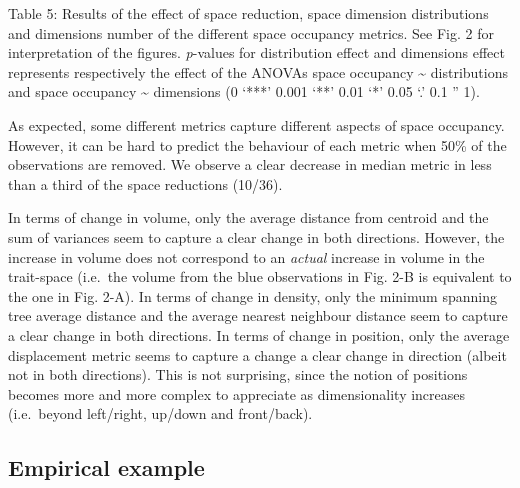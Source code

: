 \documentclass[]{article}
\begin{document}
Table 5: Results of the effect of space reduction, space dimension
distributions and dimensions number of the different space occupancy
metrics. See Fig. 2 for interpretation of the figures. \emph{p}-values
for distribution effect and dimensions effect represents respectively
the effect of the ANOVAs space occupancy \textasciitilde{} distributions
and space occupancy \textasciitilde{} dimensions (0 `***' 0.001 `**'
0.01 `*' 0.05 `.' 0.1 '' 1).

\renewcommand\baselinestretch{2}\selectfont


As expected, some different metrics capture different aspects of space
occupancy. However, it can be hard to predict the behaviour of each
metric when 50\% of the observations are removed. We observe a clear
decrease in median metric in less than a third of the space reductions
(10/36).

In terms of change in volume, only the average distance from centroid
and the sum of variances seem to capture a clear change in both
directions. However, the increase in volume does not correspond to an
\emph{actual} increase in volume in the trait-space (i.e.~the volume
from the blue observations in Fig. 2-B is equivalent to the one in Fig.
2-A). In terms of change in density, only the minimum spanning tree
average distance and the average nearest neighbour distance seem to
capture a clear change in both directions. In terms of change in
position, only the average displacement metric seems to capture a change
a clear change in direction (albeit not in both directions). This is not
surprising, since the notion of positions becomes more and more complex
to appreciate as dimensionality increases (i.e.~beyond left/right,
up/down and front/back).

\subsection{Empirical example}\label{empirical-example}

\renewcommand\baselinestretch{1}\selectfont
\end{document}
